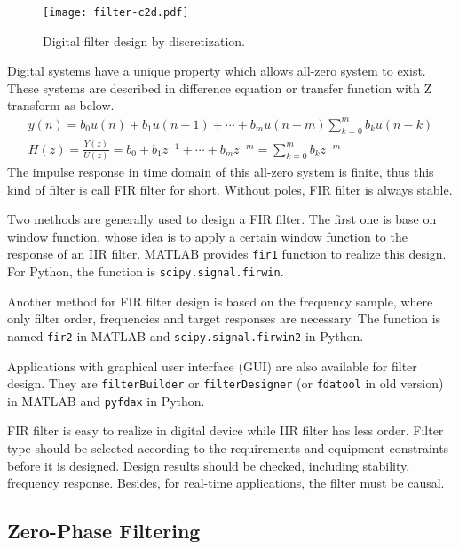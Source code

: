 \begin{figure}[!htb]
    \centering
    \texttt{[image: filter-c2d.pdf]}
    \caption{Digital filter design by discretization.}
    \label{fig:filter-c2d}
\end{figure}


Digital systems have a unique property which allows all-zero system to exist. These systems are described in difference equation or transfer function with Z transform as below.
\begin{gather}
    y(n) = b_0 u(n) + b_1 u(n-1) + \cdots + b_m u(n-m) 
     \sum_{k=0}^{m} b_k u(n-k) \\
    H(z) = \frac{Y(z)}{U(z)} = b_0 + b_1 z^{-1} + \cdots + b_m z^{-m} = \sum_{k=0}^{m} b_k z^{-m}
\end{gather}
The impulse response in time domain of this all-zero system is finite, thus this kind of filter is call FIR filter for short. Without poles, FIR filter is always stable.


Two methods are generally used to design a FIR filter. The first one is base on window function, whose idea is to apply a certain window function to the response of an IIR filter. MATLAB provides \verb|fir1| function to realize this design. For Python, the function is \verb|scipy.signal.firwin|.


Another method for FIR filter design is based on the frequency sample, where only filter order, frequencies and target responses are necessary. The function is named \verb|fir2| in MATLAB and \verb|scipy.signal.firwin2| in Python.


Applications with graphical user interface (GUI) are also available for filter design. They are \verb|filterBuilder| or \verb|filterDesigner| (or \verb|fdatool| in old version) in MATLAB and \verb|pyfdax| in Python.


FIR filter is easy to realize in digital device while IIR filter has less order. Filter type should be selected according to the requirements and equipment constraints before it is designed. Design results should be checked, including stability, frequency response. Besides, for real-time applications, the filter must be causal.




\subsection{Zero-Phase Filtering}


